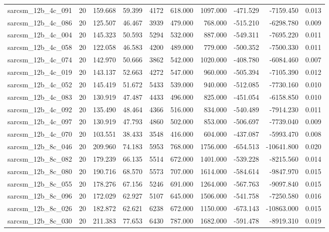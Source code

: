 \begin{tabular}{lrrrrrrrrr}
sarcsm\_12b\_4c\_091 & 20 & 159.668 & 59.399 & 4172 & 618.000 & 1097.000 & -471.529 & -7159.450 & 0.013 \\
sarcsm\_12b\_4c\_086 & 20 & 125.507 & 46.467 & 3939 & 479.000 & 768.000 & -515.210 & -6298.780 & 0.009 \\
sarcsm\_12b\_4c\_004 & 20 & 145.323 & 50.593 & 5294 & 532.000 & 887.000 & -549.311 & -7695.220 & 0.011 \\
sarcsm\_12b\_4c\_058 & 20 & 122.058 & 46.583 & 4200 & 489.000 & 779.000 & -500.352 & -7500.330 & 0.011 \\
sarcsm\_12b\_4c\_074 & 20 & 142.970 & 50.666 & 3862 & 542.000 & 1020.000 & -408.780 & -6084.460 & 0.007 \\
sarcsm\_12b\_4c\_019 & 20 & 143.137 & 52.663 & 4272 & 547.000 & 960.000 & -505.394 & -7105.390 & 0.012 \\
sarcsm\_12b\_4c\_052 & 20 & 145.419 & 51.672 & 5433 & 539.000 & 940.000 & -512.085 & -7730.160 & 0.010 \\
sarcsm\_12b\_4c\_083 & 20 & 130.919 & 47.487 & 4433 & 496.000 & 825.000 & -451.054 & -6158.850 & 0.010 \\
sarcsm\_12b\_4c\_092 & 20 & 135.490 & 48.464 & 4366 & 516.000 & 834.000 & -540.489 & -7914.230 & 0.011 \\
sarcsm\_12b\_4c\_097 & 20 & 130.919 & 47.793 & 4860 & 502.000 & 853.000 & -506.697 & -7739.040 & 0.009 \\
sarcsm\_12b\_4c\_070 & 20 & 103.551 & 38.433 & 3548 & 416.000 & 604.000 & -437.087 & -5993.470 & 0.008 \\
sarcsm\_12b\_8c\_046 & 20 & 209.960 & 74.183 & 5953 & 768.000 & 1756.000 & -654.513 & -10641.800 & 0.020 \\
sarcsm\_12b\_8c\_082 & 20 & 179.239 & 66.135 & 5514 & 672.000 & 1401.000 & -539.228 & -8215.560 & 0.014 \\
sarcsm\_12b\_8c\_080 & 20 & 190.716 & 68.570 & 5573 & 707.000 & 1614.000 & -584.614 & -9847.970 & 0.015 \\
sarcsm\_12b\_8c\_055 & 20 & 178.276 & 67.156 & 5246 & 691.000 & 1264.000 & -567.763 & -9097.840 & 0.015 \\
sarcsm\_12b\_8c\_096 & 20 & 172.029 & 62.927 & 5107 & 645.000 & 1506.000 & -541.758 & -7250.580 & 0.016 \\
sarcsm\_12b\_8c\_026 & 20 & 182.872 & 62.621 & 6238 & 672.000 & 1150.000 & -673.143 & -10863.000 & 0.015 \\
sarcsm\_12b\_8c\_030 & 20 & 211.383 & 77.653 & 6430 & 787.000 & 1682.000 & -591.478 & -8919.310 & 0.019 \\

\end{tabular}
